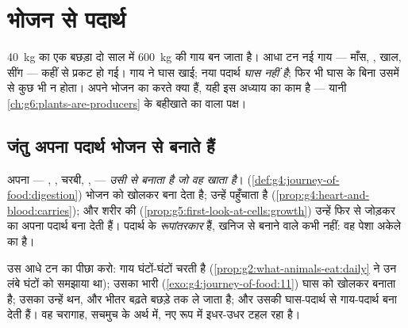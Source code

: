 \chapter{भोजन से पदार्थ}\label{ch:g6:matter-from-food}

\qty{40}{kg} का एक बछड़ा दो साल में \qty{600}{kg} की गाय बन जाता है।
आधा टन नई गाय --- माँस, , खाल, सींग --- कहीं से प्रकट हो गई। गाय
ने घास खाई; नया पदार्थ \emph{घास नहीं है}; फिर भी घास के बिना उसमें से
कुछ भी न होता।  अपने भोजन का करते क्या हैं, यही इस अध्याय का काम है
--- यानी \cref{ch:g6:plants-are-producers} के बहीखाते का  वाला
पक्ष।

\section{जंतु अपना पदार्थ भोजन से बनाते हैं}

\begin{proposition}\label{prop:g6:matter-from-food:transform}
 अपना  --- , , चरबी, ,  ---
\emph{उसी  से बनाता है जो वह खाता है}। 
(\cref{def:g4:journey-of-food:digestion}) भोजन को खोलकर  बना
देता है;  उन्हें पहुँचाता है
(\cref{prop:g4:heart-and-blood:carries}); और शरीर की 
(\cref{prop:g5:first-look-at-cells:growth}) उन्हें फिर से जोड़कर 
का अपना पदार्थ बना देती हैं।  पदार्थ के \emph{रूपांतरकार} हैं,
खनिज से बनाने वाले कभी नहीं: वह पेशा अकेले  का है।
\end{proposition}
\admitted

\begin{example}[घास से गाय]\label{ex:g6:matter-from-food:cow}
उस आधे टन का पीछा करो: गाय घंटों-घंटों चरती है
(\cref{prop:g2:what-animals-eat:daily} ने उन लंबे घंटों को समझाया था);
उसका भारी  (\cref{exo:g4:journey-of-food:11}) घास को खोलकर  बनाता है; उसका  उन्हें थन,  और भीतर बढ़ते बछड़े तक ले
जाता है; और उसकी  घास-पदार्थ से गाय-पदार्थ बना देती हैं। वह
चरागाह, सचमुच के अर्थ में, नए रूप में इधर-उधर टहल रहा है।
\end{example}

